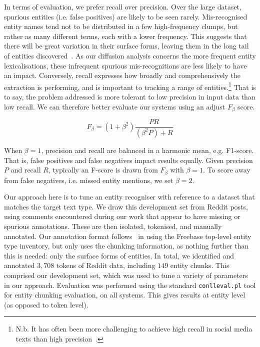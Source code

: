 \documentclass[10pt,journal,compsoc]{IEEEtran}
\begin{document}
In terms of evaluation, we prefer recall over precision.
Over the large dataset, spurious entities (i.e. false positives) are likely to be seen rarely.
Mis-recognised entity names tend not to be distributed in a few high-frequency clumps, but rather as many different terms, each with a lower frequency.
This suggests that there will be great variation in their surface forms, leaving them in the long tail of entities discovered~\cite{leginus2015enhanced}.
As our diffusion analysis concerns the more frequent entity lexicalisations, these infrequent spurious mis-recognitions are less likely to have an impact.
Conversely, recall expresses how broadly and comprehensively the extraction is performing, and is important to tracking a range of entities.\footnote{N.b. It has often been more challenging to achieve high recall in social media texts than high precision~\cite{ritter2011named,derczynski2015analysis}.}
That is to say, the problem addressed is more tolerant to low precision in input data than low recall.
We can therefore better evaluate our systems using an adjust $F_\beta$ score.

\begin{equation}
F_\beta = (1+\beta^2)\frac{PR}{(\beta^2 P) + R} 
\end{equation}

When $\beta=1$, precision and recall are balanced in a harmonic mean, e.g. F1-score.
That is, false positives and false negatives impact results equally.
Given precision $P$ and recall $R$, typically an F-score is drawn from $F_\beta$ with $\beta=1$.
To score away from false negatives, i.e. missed entity mentions, we set $\beta=2$.

Our approach here is to tune an entity recogniser with reference to a dataset that matches the target text type.
We draw this development set from Reddit posts, using comments encountered during our work that appear to have missing or spurious annotations.
These are then isolated, tokenised, and manually annotated.
Our annotation format follows~\cite{ritter2011named} in using the Freebase top-level entity type inventory, but only uses the chunking information, as nothing further than this is needed: only the surface forms of entities.
In total, we identified and annotated $3,708$ tokens of Reddit data, including $149$ entity chunks.
This comprised our development set, which was used to tune a variety of parameters in our approach.
Evaluation was performed using the standard {\tt \small conlleval.pl} tool for entity chunking evaluation, on all systems.
This gives results at entity level (as opposed to token level).
\end{document}
